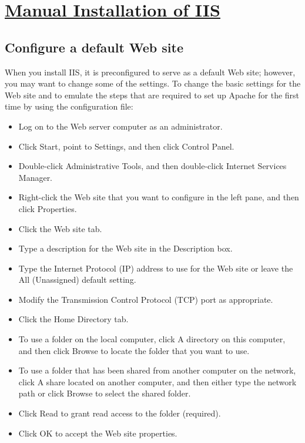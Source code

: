 
\section*{\underline{\textbf{Manual Installation of IIS}}}
\subsection*{Configure a default Web site}
When you install IIS, it is preconfigured to serve as a default Web site; however, you may want to change some of the settings. To change the basic settings for the Web site and to emulate the steps that are required to set up Apache for the first time by using the configuration file:
\begin{itemize}
\item Log on to the Web server computer as an administrator.
\item Click Start, point to Settings, and then click Control Panel.
\item Double-click Administrative Tools, and then double-click Internet Services Manager.
\item Right-click the Web site that you want to configure in the left pane, and then click Properties.
\item Click the Web site tab.
\item Type a description for the Web site in the Description box.
\item Type the Internet Protocol (IP) address to use for the Web site or leave the All (Unassigned) default setting.
\item Modify the Transmission Control Protocol (TCP) port as appropriate.
\item Click the Home Directory tab.
\item To use a folder on the local computer, click A directory on this computer, and then click Browse to locate the folder that you want to use.
\item To use a folder that has been shared from another computer on the network, click A share located on another computer, and then either type the network path or click Browse to select the shared folder.
\item Click Read to grant read access to the folder (required).
\item Click OK to accept the Web site properties.
\end{itemize}
